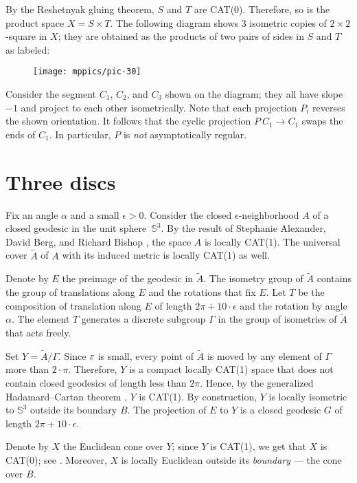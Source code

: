 \documentclass[a4paper,10pt]{article}
\begin{document}
By the Reshetnyak gluing theorem, $S$ and $T$ are CAT(0).
Therefore, so is the product space $X=S\times T$.
The following diagram shows 3 isometric copies of $2{\times}2$-square in $X$; they are obtained as the products of two pairs of sides in $S$ and $T$ as labeled:
\begin{figure}[ht!]
\vskip0mm
\centering
\texttt{[image: mppics/pic-30]}
\end{figure}

Consider the segment $C_1$, $C_2$, and $C_3$ shown on the diagram;
they all have slope $-1$ and project to each other isometrically.
Note that each projection $P_i$ reverses the shown orientation.
It follows that the cyclic projection $P\:C_1\to C_1$ swaps the ends of $C_1$.
In particular, $P$ is \emph{not} asymptotically regular.


\section{Three discs}\label{sec:discs}

Fix an angle $\alpha$ and a small $\epsilon>0$.
Consider the closed 
$\epsilon$-neighborhood $A$ of a closed geodesic in the unit sphere~$\mathbb{S}^3$.
By the result of Stephanie Alexander,  David Berg, and Richard Bishop \cite {ABB-1993}, the space $A$ is locally CAT(1).
The universal cover $\tilde A$ of $A$ with its induced metric is locally CAT(1) as well. 

Denote by $E$ the preimage of the geodesic in $\tilde A$.
The isometry group of $\tilde A$ 
contains the group of translations along $E$ and 
the rotations that fix $E$.
Let $T$  be the composition of translation along $E$  of length $2\pi +10\cdot\epsilon$ and the rotation by angle $\alpha$.
The element $T$ generates a discrete subgroup $\Gamma$ in the group of isometries  of $\tilde A$ that acts freely.

Set $Y =\tilde A/\Gamma$.
Since $\varepsilon$ is small, every point of $\tilde A$ is moved by any element of $\Gamma$ more than $2\cdot\pi$.
Therefore, $Y$ is a compact locally CAT(1) space that does not contain closed geodesics of length less than $2\pi$.
Hence, by  the generalized Hadamard--Cartan theorem \cite{AKP}, $Y$ is CAT(1).
By construction, $Y$ is locally isometric to $\mathbb{S}^3$ outside its boundary $B$.
The projection of $E$ to $Y$ is a closed geodesic $G$ of length $2\pi +10\cdot\epsilon$.

Denote by $X$ the Euclidean cone over $Y$;
since $Y$ is CAT(1), we get that $X$ is CAT(0); see \cite{AKP}.
Moreover, $X$ is locally Euclidean outside its \emph{boundary} --- the cone over $B$.
\end{document}
